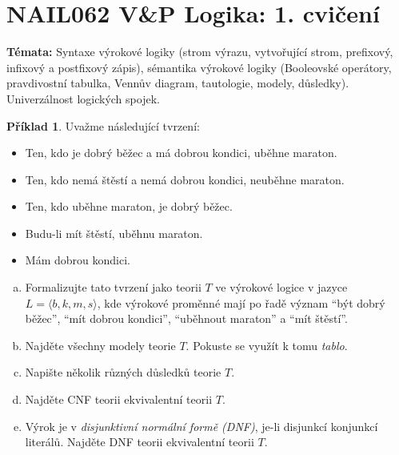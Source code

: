 \documentclass[a4paper]{article}
\theoremstyle{definition}
\newtheorem{problem}{Příklad}
\begin{document}
\section*{NAIL062 V\&P Logika: 1. cvičení}


\textbf{Témata:} 
Syntaxe výrokové logiky (strom výrazu, vytvořující strom, prefixový, infixový a postfixový zápis), sémantika výrokové logiky (Booleovské operátory, pravdivostní tabulka, Vennův diagram, tautologie, modely, důsledky). Univerzálnost logických spojek.


\medskip\begin{problem}
Uvažme následující tvrzení:
\begin{itemize}
\item Ten, kdo je dobrý běžec a má dobrou kondici, uběhne maraton.
\item Ten, kdo nemá štěstí a nemá dobrou kondici, neuběhne maraton.
\item Ten, kdo uběhne maraton, je dobrý běžec.
\item Budu-li mít štěstí, uběhnu maraton.
\item Mám dobrou kondici.
\end{itemize}
\begin{enumerate}[(a)]
\item Formalizujte tato tvrzení jako teorii $T$ ve výrokové logice v jazyce $L=\langle b, k, m, s\rangle$, kde výrokové proměnné mají po řadě význam ``být dobrý běžec'', ``mít dobrou kondici'', ``uběhnout maraton'' a ``mít štěstí''.
\item Najděte všechny modely teorie $T$. Pokuste se využít k tomu \emph{tablo}.
\item Napište několik různých důsledků teorie $T$.
\item Najděte CNF teorii ekvivalentní teorii $T$.
\item Výrok je v \emph{disjunktivní normální formě (DNF)}, je-li disjunkcí konjunkcí literálů. Najděte DNF teorii ekvivalentní teorii $T$. 
\end{enumerate}
\end{problem}
\end{document}
